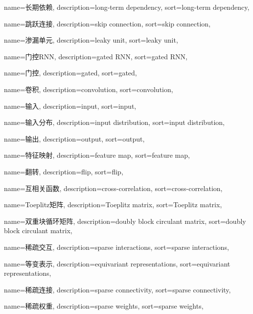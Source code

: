 {
  name=长期依赖,
  description={long-term dependency},
  sort={long-term dependency},
}

{
  name=跳跃连接,
  description={skip connection},
  sort={skip connection},
}

{
  name=渗漏单元,
  description={leaky unit},
  sort={leaky unit},
}

{
  name=门控RNN,
  description={gated RNN},
  sort={gated RNN},
}

{
  name=门控,
  description={gated},
  sort={gated},
}

{
  name=卷积,
  description={convolution},
  sort={convolution},
}

{
  name=输入,
  description={input},
  sort={input},
}

{
  name=输入分布,
  description={input distribution},
  sort={input distribution},
}

{
  name=输出,
  description={output},
  sort={output},
}

{
  name=特征映射,
  description={feature map},
  sort={feature map},
}

{
  name=翻转,
  description={flip},
  sort={flip},
}

{
  name=互相关函数,
  description={cross-correlation},
  sort={cross-correlation},
}

{
  name=Toeplitz矩阵,
  description={Toeplitz matrix},
  sort={Toeplitz matrix},
}

{
  name=双重块循环矩阵,
  description={doubly block circulant matrix},
  sort={doubly block circulant matrix},
}

{
  name=稀疏交互,
  description={sparse interactions},
  sort={sparse interactions},
}

{
  name=等变表示,
  description={equivariant representations},
  sort={equivariant representations},
}

{
  name=稀疏连接,
  description={sparse connectivity},
  sort={sparse connectivity},
}

{
  name=稀疏权重,
  description={sparse weights},
  sort={sparse weights},
}

